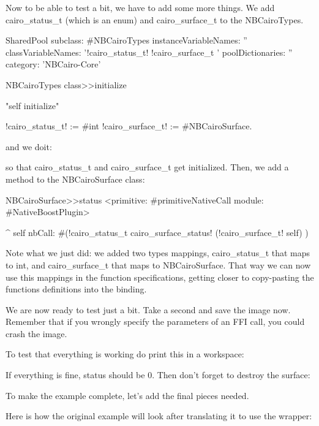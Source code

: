 \documentclass[a4paper,10pt,twoside]{book}
\begin{document}
Now to be able to test a bit, we have to add some more things. We add 
cairo\_status\_t (which is an enum) and cairo\_surface\_t to the NBCairoTypes.

   
\begin{classdef}{}
SharedPool subclass: #NBCairoTypes
	instanceVariableNames: ''
	classVariableNames: '!cairo\_status\_t! !cairo\_surface\_t '
	poolDictionaries: ''
	category: 'NBCairo-Core'
\end{classdef}

\begin{code}{}
NBCairoTypes class>>initialize

	"self initialize"
		
	!cairo\_status\_t! := #int
	!cairo\_surface\_t!  := #NBCairoSurface.
\end{code}

and we doit:


so that cairo\_status\_t and cairo\_surface\_t get initialized. Then, we add a method to
the NBCairoSurface class:

\begin{code}{}
NBCairoSurface>>status
	<primitive: #primitiveNativeCall module: #NativeBoostPlugin>
	
	^ self nbCall: #(!cairo\_status\_t cairo\_surface\_status! (!cairo\_surface\_t! self) )
\end{code}

Note what we just did: we added two types mappings, cairo\_status\_t that maps to int, and
cairo\_surface\_t that maps to NBCairoSurface. That way we can now use this mappings in the
function specifications, getting closer to copy-pasting the functions definitions into
the binding.

We are now ready to test just a bit. Take a second and save the
image now. Remember that if you wrongly specify the parameters
of an FFI call, you could crash the image.

To test that everything is working do print this in a workspace:


If everything is fine, status should be 0. Then don't forget
to destroy the surface:



To make the example complete, let's add the final pieces needed.

Here is how the original example will look after translating
it to use the wrapper:
\end{document}
